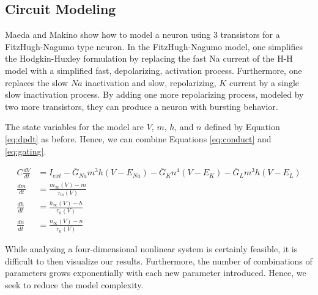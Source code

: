 \documentclass[12]{book}
\newcommand\0{\mathbf{0}}
\newcommand\<{\langle}
\renewcommand\>{\rangle}
\begin{document}
\subsection{Circuit Modeling} 

Maeda and Makino \cite{maeda2000pulse} show how to model a neuron using 3 transistors for a FitzHugh-Nagumo type neuron. In the FitzHugh-Nagumo model, one simplifies the Hodgkin-Huxley formulation by replacing the fast Na current of the H-H model with a simplified fast, depolarizing, activation process. Furthermore, one replaces the slow $Na$ inactivation and slow, repolarizing, $K$ current by a single slow inactivation process. By adding one more repolarizing process, modeled by two more transistors, they can produce a neuron with bursting behavior. 

The state variables for the model are $V$, $m$, $h$, and $n$ defined by Equation \ref{eq:dpdt} as before. Hence, we can combine Equations \ref{eq:conduct} and \ref{eq:gating}.

\begin{align*}
    C\frac{dV}{dt} &= I_{ext} -\bar{G}_{Na}m^3h(V-E_{Na}) -\bar{G}_{K}n^4(V-E_{K})  -\bar{G}_{L}m^3h(V-E_{L}) \\
    \frac{dm}{dt} &= \frac{m_{\infty}(V)-m}{\tau_m(V)} \\
    \frac{dh}{dt} &= \frac{h_{\infty}(V)-h}{\tau_h(V)} \\
    \frac{dn}{dt} &= \frac{n_{\infty}(V)-n}{\tau_n(V)} 
\end{align*}

While analyzing a four-dimensional nonlinear system is certainly feasible, it is difficult to then visualize our results. Furthermore, the number of combinations of parameters grows exponentially with each new parameter introduced. Hence, we seek to reduce the model complexity.
\end{document}
